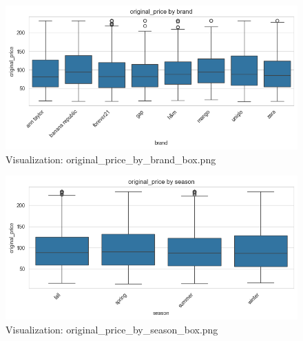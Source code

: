 \documentclass{article}%
\begin{document}
\vspace{10pt}%
\\%
\begin{minipage}[c]{0.48\textwidth}%


\begin{figure}[H]%
\centering%
\includegraphics[width=\linewidth]{output/plots/original_price_by_brand_box.png}%
\caption{Visualization: original\_price\_by\_brand\_box.png}%
\end{figure}

%
\end{minipage}%
\begin{minipage}[c]{0.48\textwidth}%


\begin{figure}[H]%
\centering%
\includegraphics[width=\linewidth]{output/plots/original_price_by_season_box.png}%
\caption{Visualization: original\_price\_by\_season\_box.png}%
\end{figure}

%
\end{minipage}%
\vspace{10pt}%
\\%
\end{document}
